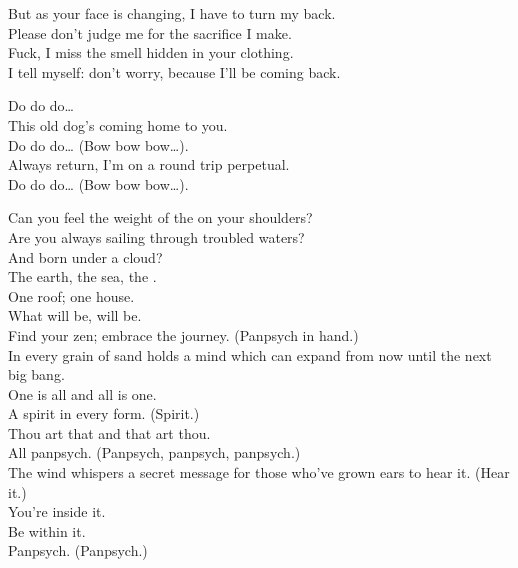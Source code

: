 
But as your face is changing, I have to turn my back. \\
Please don't judge me for the sacrifice I make. \\
Fuck, I miss the smell hidden in your clothing. \\
I tell myself: don't worry, because I'll be coming back. \\


Do do do… \\
This old dog's coming home to you. \\
Do do do… (Bow bow bow…). \\
Always return, I'm on a round trip perpetual. \\
Do do do… (Bow bow bow…). \\





Can you feel the weight of the  on your shoulders? \\
Are you always sailing through troubled waters? \\
And born under a cloud? \\
The earth, the sea, the . \\
One roof; one house. \\

What will be, will be. \\
Find your zen; embrace the journey. (Panpsych in hand.) \\
In every grain of sand holds a mind which can expand from now until the next big bang. \\

One is all and all is one. \\
A spirit in every form. (Spirit.) \\
Thou art that and that art thou. \\
All panpsych. (Panpsych, panpsych, panpsych.) \\
The wind whispers a secret message for those who've grown ears to hear it. (Hear it.) \\
You're inside it. \\
Be within it. \\
Panpsych. (Panpsych.) \\

